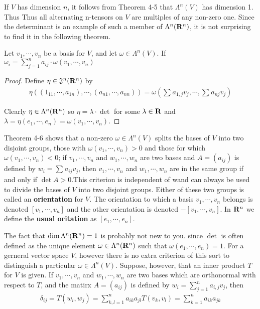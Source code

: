 If $V$ has dimension $n$, it follows from Theorem 4-5 that $\Lambda^n(V)$ has dimension 1. Thus 
Thus all alternating n-tensors on $V$ are multiples of any non-zero one.
Since the determinant is an example of such a member of $\Lambda^n(\mathbf{R}^n)$, it is not surprising
to find it in the following theorem.
\begin{theorem}
    Let $v_1, \cdots, v_n$ be a basis for $V$, and let $\omega\in \Lambda^n(V)$. If 
    $\omega_i = \sum_{j=1}^{n}{a_{ij}\cdot\omega(v_1, \cdots, v_n)}$
\end{theorem}

\begin{proof}
    Define $\eta\in \mathfrak{J}^n(\mathbf{R}^n)$ by 
    \begin{align*}
        \eta((1_{11}, \cdots, a_{1n}), \cdots, (a_{n1}, \cdots, a_{nn}))
        = \omega\left(\sum_{}^{}{a_{1,j}v_j}, \cdots, \sum_{}^{}{a_{nj}v_j}\right)
    \end{align*}

    Clearly $\eta\in \Lambda^n(\mathbf{R}^n)$ so $\eta=\lambda\cdot\det$ for some $\lambda\in \mathbf{R}$
    and $\lambda=\eta(e_1,\cdots,e_n) = \omega(v_1, \cdots, v_n)$.
\end{proof}

Theorem 4-6 shows that a non-zero $\omega\in \Lambda^n(V)$ splits the
bases of $V$ into two disjoint groups, those with $\omega(v_1, \cdots, v_n)>0$ 
and those for which $\omega(v_1, \cdots, v_n) < 0$; if $v_1, \cdots, v_n$
and $w_1,\cdots, w_n$ are two bases and $A = (a_{ij})$ is defined by
$w_i = \sum_{}^{}{a_{ij}v_j}$, then $v_1,\cdots,v_n$ and $w_1, \cdots, w_n$ are in the
same group if and only if $\det A > 0$.This criterion is independent of wand can always 
be used to divide the bases of $V$ into two disjoint groups.
Either of these two groups is called an \textbf{orientation} for $V$.
The orientation to which a basis $v_1,\cdots,v_n$ belongs is denoted 
$[v_1, \cdots, v_n]$ and the other orientation is denoted $-[v_1, \cdots, v_n]$.
In $\mathbf{R}^n$ we define the \textbf{usual oritation} as $[e_1, \cdots, e_n]$.

The fact that $\dim \Lambda^n(\mathbf{R}^n)=1$ is probably not new to you. 
since $\det$ is often defined as the unique element $\omega\in\Lambda^n(\mathbf{R}^n)$ such that 
$\omega(e_1, \cdots, e_n) = 1$. For a gerneral vector space $V$, however there is no extra 
criterion of this sort to distinguish a particular $\omega\in\Lambda^n(V)$. Suppose, however,
that an inner product $T$ for $V$ is given. If $v_1, \cdots, v_n$ and $w_1, \cdots, w_n$ are
two bases which are orthonormal with respect to $T$, and the matirx $A=(a_{ij})$ is defined by 
$w_i = \sum_{j=1}^{n}{a_{i,j}v_j}$, then 
\begin{align*}
    \delta_{ij} = T(w_i, w_j) 
        = \sum_{k,l=1}^{n}{a_{ik}a_{jl}T(v_k,v_l)} 
        = \sum_{k=1}^{n}{a_{ik}a_{jk}}
\end{align*}

